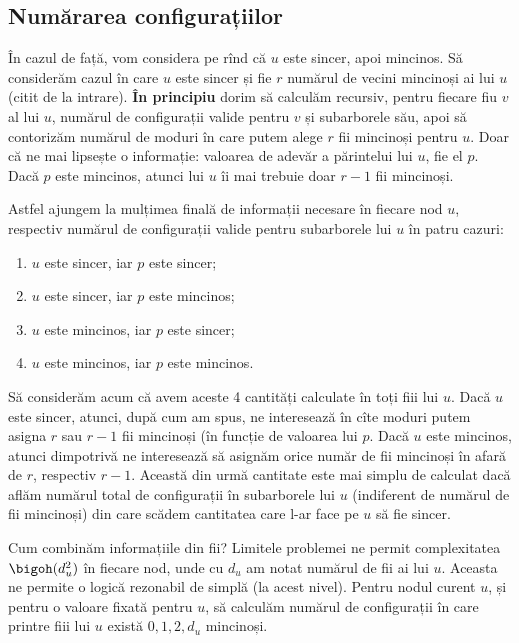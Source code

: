 \subsection{Numărarea configurațiilor}

În cazul de față, vom considera pe rînd că $u$ este sincer, apoi mincinos. Să considerăm cazul în care $u$ este sincer și fie $r$ numărul de vecini mincinoși ai lui $u$ (citit de la intrare). \textbf{În principiu} dorim să calculăm recursiv, pentru fiecare fiu $v$ al lui $u$, numărul de configurații valide pentru $v$ și subarborele său, apoi să contorizăm numărul de moduri în care putem alege $r$ fii mincinoși pentru $u$. Doar că ne mai lipsește o informație: valoarea de adevăr a părintelui lui $u$, fie el $p$. Dacă $p$ este mincinos, atunci lui $u$ îi mai trebuie doar $r-1$ fii mincinoși.

Astfel ajungem la mulțimea finală de informații necesare în fiecare nod $u$, respectiv numărul de configurații valide pentru subarborele lui $u$ în patru cazuri:

\begin{enumerate}
  \item $u$ este sincer, iar $p$ este sincer;
  \item $u$ este sincer, iar $p$ este mincinos;
  \item $u$ este mincinos, iar $p$ este sincer;
  \item $u$ este mincinos, iar $p$ este mincinos.
\end{enumerate}

Să considerăm acum că avem aceste 4 cantități calculate în toți fiii lui $u$. Dacă $u$ este sincer, atunci, după cum am spus, ne interesează în cîte moduri putem asigna $r$ sau $r-1$ fii mincinoși (în funcție de valoarea lui $p$. Dacă $u$ este mincinos, atunci dimpotrivă ne interesează să asignăm orice număr de fii mincinoși în afară de $r$, respectiv $r-1$. Această din urmă cantitate este mai simplu de calculat dacă aflăm numărul total de configurații în subarborele lui $u$ (indiferent de numărul de fii mincinoși) din care scădem cantitatea care l-ar face pe $u$ să fie sincer.

Cum combinăm informațiile din fii? Limitele problemei ne permit complexitatea $\bigoh(d_u^2)$ în fiecare nod, unde cu $d_u$ am notat numărul de fii ai lui $u$. Aceasta ne permite o logică rezonabil de simplă (la acest nivel). Pentru nodul curent $u$, și pentru o valoare fixată pentru $u$, să calculăm numărul de configurații în care printre fiii lui $u$ există $0, 1, 2, d_u$ mincinoși.

